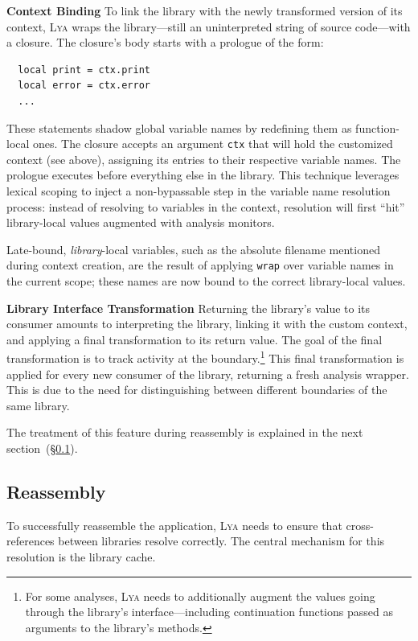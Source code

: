\documentclass[letterpaper,twocolumn,10pt]{article}
\newcommand{\heading}[1]{\vspace{2pt}\noindent\textbf{#1}\enspace}
\newcommand{\ttt}[1]{\texttt{#1}}
\newcommand{\sx}[1]{(\S\ref{#1})}
\newcommand{\sys}{{\scshape Lya}\xspace}
\begin{document}
\heading{Context Binding}
To link the library with the newly transformed version of its context, \sys wraps the library---still an uninterpreted string of source code---with a closure.
The closure's body starts with a prologue of the form:
\begin{verbatim}
  local print = ctx.print
  local error = ctx.error
  ...
\end{verbatim}
These statements shadow global variable names by redefining them as function-local ones.
The closure accepts an argument \ttt{ctx} that will hold the customized context (see above), assigning its entries to their respective variable names.
The prologue executes before everything else in the library.
This technique leverages lexical scoping to inject a non-bypassable step in the variable name resolution process:
  instead of resolving to variables in the context, resolution will first ``hit'' library-local values augmented with analysis monitors.

Late-bound, \emph{library}-local variables, such as the absolute filename mentioned during context creation, are the result of applying \ttt{wrap} over variable names in the current scope;
  these names are now bound to the correct library-local values.

\heading{Library Interface Transformation}
Returning the library's value to its consumer amounts to interpreting the library, linking it with the custom context, and applying a final transformation to its return value.
The goal of the final transformation is to track activity at the boundary.\footnote{
  For some analyses, \sys needs to additionally augment the values going through the library's interface---including continuation functions passed as arguments to the library's methods.}
This final transformation is applied for every new consumer of the library, returning a fresh analysis wrapper.
This is due to the need for distinguishing between different boundaries of the same library.

The treatment of this feature during reassembly is explained in the next section~\sx{three}.
  

\subsection{Reassembly}
\label{three}

To successfully reassemble the application, \sys needs to ensure that cross-references between libraries resolve correctly.
The central mechanism for this resolution is the library cache.
\end{document}
